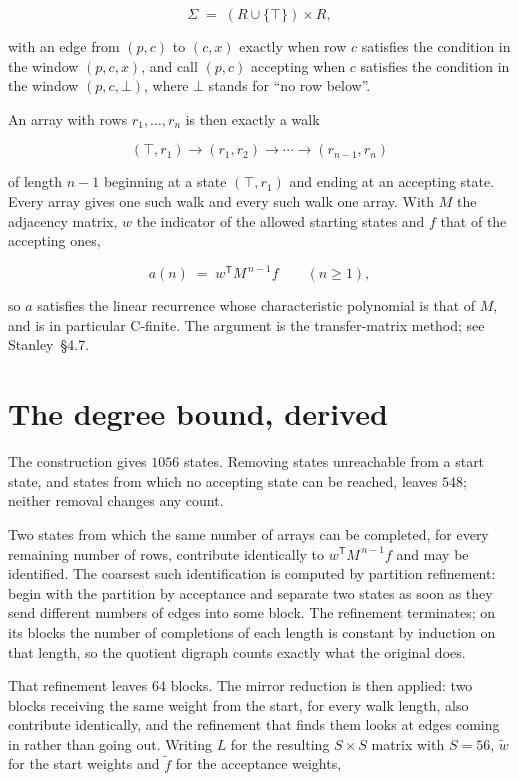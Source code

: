 \documentclass[11pt]{article}
\theoremstyle{definition}
\begin{document}
\[\Sigma \;=\; (R \cup \{\top\}) \times R,\]

with an edge from $(p,c)$ to $(c,x)$ exactly when row $c$ satisfies the condition in the window $(p,c,x)$, and call $(p,c)$ accepting when $c$ satisfies the condition in the window $(p,c,\bot)$, where $\bot$ stands for ``no row below''.

An array with rows $r_1,\dots,r_n$ is then exactly a walk

\[(\top,r_1) \to (r_1,r_2) \to \cdots \to (r_{n-1},r_n)\]

of length $n-1$ beginning at a state $(\top,r_1)$ and ending at an accepting state. Every array gives one such walk and every such walk one array. With $M$ the adjacency matrix, $w$ the indicator of the allowed starting states and $f$ that of the accepting ones,

\[a(n) \;=\; w^{\mathsf T} M^{\,n-1} f \qquad (n \ge 1),\]

so $a$ satisfies the linear recurrence whose characteristic polynomial is that of $M$, and is in particular C-finite. The argument is the transfer-matrix method; see Stanley~\S4.7.

\section{The degree bound, derived}

The construction gives $1056$ states. Removing states unreachable from a start state, and states from which no accepting state can be reached, leaves $548$; neither removal changes any count.

Two states from which the same number of arrays can be completed, for every remaining number of rows, contribute identically to $w^{\mathsf T}M^{\,n-1}f$ and may be identified. The coarsest such identification is computed by partition refinement: begin with the partition by acceptance and separate two states as soon as they send different numbers of edges into some block. The refinement terminates; on its blocks the number of completions of each length is constant by induction on that length, so the quotient digraph counts exactly what the original does.

That refinement leaves $64$ blocks. The mirror reduction is then applied: two blocks receiving the same weight from the start, for every walk length, also contribute identically, and the refinement that finds them looks at edges coming in rather than going out. Writing $L$ for the resulting $S \times S$ matrix with $S = 56$, $\tilde w$ for the start weights and $\tilde f$ for the acceptance weights,
\end{document}
